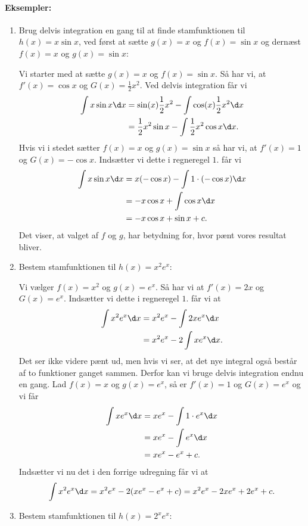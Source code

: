 \paragraph*{Eksempler:}
\begin{enumerate}
\item Brug delvis integration en gang til at finde stamfunktionen til $h(x)=x\sin x$, ved først at sætte $g(x)=x$ og $f(x) = \sin x$ og dernæst $f(x)=x$ og $g(x)=\sin x$:

Vi starter med at sætte $g(x)=x$ og $f(x) = \sin x$. Så har vi, at $f'(x)=\cos x$ og $G(x) = \frac{1}{2}x^2$. Ved delvis integration får vi
\begin{align*}
\int x \sin x \d x &= \sin (x) \frac{1}{2}x^2 - \int \cos (x)  \frac{1}{2}x^2 \d x\\
&=\frac{1}{2}x^2 \sin x - \int \frac{1}{2}x^2 \cos x \d x.
\end{align*}
Hvis vi i stedet sætter $f(x)=x$ og $g(x)=\sin x$ så har vi, at $f'(x)=1$ og $G(x)=-\cos x$. Indsætter vi dette i regneregel $1.$ får vi
\begin{align*}
\int x \sin x \d x &= x (-\cos x) - \int 1 \cdot (-\cos x) \d x \\
&= -x\cos x + \int \cos x \d x \\
&= -x \cos x + \sin x +c.
\end{align*}
Det viser, at valget af $f$ og $g$, har betydning for, hvor pænt vores resultat bliver.

\item Bestem stamfunktionen til $h(x)=x^2e^x$:

Vi vælger $f(x)=x^2$ og $g(x)=e^x$. Så har vi at $f'(x)=2x$ og $G(x)=e^x$. Indsætter vi dette i regneregel $1$. får vi at
\begin{align*}
\int x^2 e^x \d x &= x^2 e^x - \int 2x e^x \d x \\
&= x^2 e^x - 2\int x e^x \d x.
\end{align*}
Det ser ikke videre pænt ud, men hvis vi ser, at det nye integral også består af to funktioner ganget sammen. Derfor kan vi bruge delvis integration endnu en gang. Lad $f(x)=x$ og $g(x)=e^x$, så er $f'(x)=1$ og $G(x)=e^x$ og vi får 
\begin{align*}
\int x e^x \d x &= x e^x - \int 1 \cdot e^x \d x \\
&=  x e^x - \int e^x \d x \\
&= xe^x - e^x + c.
\end{align*}
Indsætter vi nu det i den forrige udregning får vi at
\begin{align*}
\int x^2 e^x \d x = x^2e^x - 2(xe^x - e^x +c) = x^2e^x-2xe^x+2e^x+c.
\end{align*}
\item Bestem stamfunktionen til $h(x)=2^xe^x$:


\end{enumerate}
